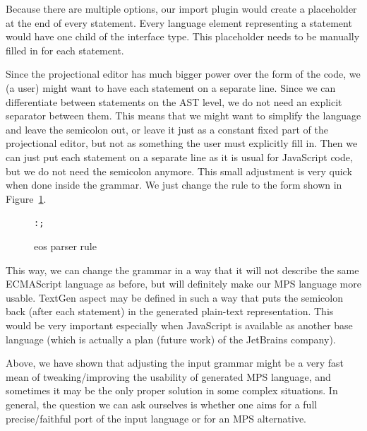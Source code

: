 Because there are multiple options, our import plugin would create a placeholder at the end of every statement.
Every language element representing a statement would have one child of the  interface type.
This placeholder needs to be manually filled in for each statement.

Since the projectional editor has much bigger power over the form of the code, we (a user) might want to have each statement on a separate line.
Since we can differentiate between statements on the AST level, we do not need an explicit separator between them.
This means that we might want to simplify the language and leave the semicolon out, or leave it just as a constant fixed part of the projectional editor, but not as something the user must explicitly fill in.
Then we can just put each statement on a separate line as it is usual for JavaScript code, but we do not need the semicolon anymore.
This small adjustment is very quick when done inside the grammar.
We just change the  rule to the form shown in Figure~\ref{fig:eosrule}.

\begin{figure}[ht]
\centering
\begin{framed}
\begin{alltt}
	 : \antlrliteral{;} ;
\end{alltt}
\end{framed}
\caption{eos parser rule}
\label{fig:eosrule}
\end{figure}

This way, we can change the grammar in a way that it will not describe the same ECMAScript language as before, but will definitely make our MPS language more usable.
TextGen aspect may be defined in such a way that puts the semicolon back (after each statement) in the generated plain-text representation.
This would be very important especially when JavaScript is available as another base language (which is actually a plan (future work) of the JetBrains company).

Above, we have shown that adjusting the input grammar might be a very fast mean of tweaking/improving the usability of generated MPS language, and sometimes it may be the only proper solution in some complex situations.
In general, the question we can ask ourselves is whether one aims for a full precise/faithful port of the input language or for an MPS alternative.


